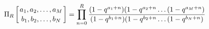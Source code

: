 $$
\Pi_R \left[{a_1, a_2, \ldots , a_M \atop b_1, b_2, \ldots, b_N} \right]
=
\prod_{n=0}^R
{(1-q^{a_1+n})(1-q^{a_2+n}\ldots(1-q^{a_M+n}) \over 
 (1-q^{b_1+n})(1-q^{b_2+n}\ldots(1-q^{b_N+n})}
$$


\bye
 
